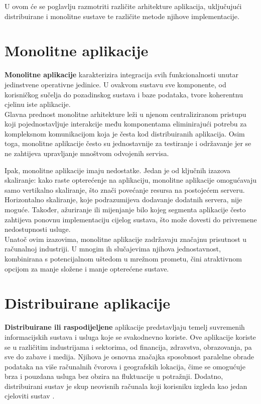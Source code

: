 \documentclass[times, utf8, diplomski]{fer}
\begin{document}
U ovom će se poglavlju razmotriti različite arhitekture aplikacija, uključujući distribuirane i monolitne sustave te različite metode njihove implementacije.


\section{Monolitne aplikacije}
\label{sec:monolith}

\textbf{Monolitne aplikacije} karakterizira integracija svih funkcionalnosti unutar jedinstvene operativne jedinice. U ovakvom sustavu sve komponente, od korisničkog sučelja do pozadinskog sustava i baze podataka, tvore koherentnu cjelinu iste aplikacije. \\

Glavna prednost monolitne arhitekture leži u njenom centraliziranom pristupu koji pojednostavljuje interakcije među komponentama eliminirajući potrebu za kompleksnom komunikacijom koja je česta kod distribuiranih aplikacija. Osim toga, monolitne aplikacije često su jednostavnije za testiranje i održavanje jer se ne zahtijeva upravljanje mnoštvom odvojenih servisa. 

Ipak, monolitne aplikacije imaju nedostatke. Jedan je od ključnih izazova skaliranje: kako raste opterećenje na aplikaciju, monolitne aplikacije omogućavaju samo vertikalno skaliranje, što znači povećanje resursa na postojećem serveru. Horizontalno skaliranje, koje podrazumijeva dodavanje dodatnih servera, nije moguće. Također, ažuriranje ili mijenjanje bilo kojeg segmenta aplikacije često zahtijeva ponovnu implementaciju  cijelog sustava, što može dovesti do privremene nedostupnosti usluge. \\

Unatoč ovim izazovima, monolitne aplikacije zadržavaju značajnu prisutnost u računalnoj industriji. U mnogim ih slučajevima njihova jednostavnost, kombinirana s potencijalnom uštedom u mrežnom prometu, čini atraktivnom opcijom za manje složene i manje opterećene sustave.


\section{Distribuirane aplikacije}
\label{sec:distributed}

\textbf{Distribuirane ili raspodijeljene} aplikacije predstavljaju temelj suvremenih informacijskih sustava i usluga koje se svakodnevno koriste. Ove aplikacije koriste se u različitim industrijama i sektorima, od financija, zdravstva, obrazovanja, pa sve do zabave i medija. Njihova je osnovna značajka sposobnost paralelne obrade podataka na više računalnih čvorova i geografskih lokacija, čime se omogućuje brza i pouzdana usluga bez obzira na fluktuacije u potražnji. Dodatno, distribuirani sustav je skup neovisnih računala koji korisniku izgleda kao jedan cjeloviti sustav \citep{tanenbaum_distributed_2007}.\\
\end{document}
